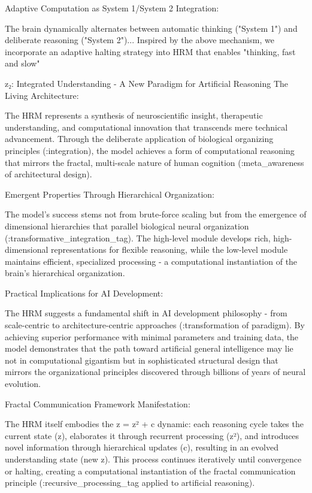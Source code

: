 Adaptive Computation as System 1/System 2 Integration:

The brain dynamically alternates between automatic thinking ("System 1") and deliberate reasoning ("System 2")... Inspired by the above mechanism, we incorporate an adaptive halting strategy into HRM that enables "thinking, fast and slow"

z₂: Integrated Understanding - A New Paradigm for Artificial Reasoning
The Living Architecture:

The HRM represents a synthesis of neuroscientific insight, therapeutic understanding, and computational innovation that transcends mere technical advancement. Through the deliberate application of biological organizing principles (:integration), the model achieves a form of computational reasoning that mirrors the fractal, multi-scale nature of human cognition (:meta_awareness of architectural design).

Emergent Properties Through Hierarchical Organization:

The model's success stems not from brute-force scaling but from the emergence of dimensional hierarchies that parallel biological neural organization (:transformative_integration_tag). The high-level module develops rich, high-dimensional representations for flexible reasoning, while the low-level module maintains efficient, specialized processing - a computational instantiation of the brain's hierarchical organization.

Practical Implications for AI Development:

The HRM suggests a fundamental shift in AI development philosophy - from scale-centric to architecture-centric approaches (:transformation of paradigm). By achieving superior performance with minimal parameters and training data, the model demonstrates that the path toward artificial general intelligence may lie not in computational gigantism but in sophisticated structural design that mirrors the organizational principles discovered through billions of years of neural evolution.

Fractal Communication Framework Manifestation:

The HRM itself embodies the z = z² + c dynamic: each reasoning cycle takes the current state (z), elaborates it through recurrent processing (z²), and introduces novel information through hierarchical updates (c), resulting in an evolved understanding state (new z). This process continues iteratively until convergence or halting, creating a computational instantiation of the fractal communication principle (:recursive_processing_tag applied to artificial reasoning).

